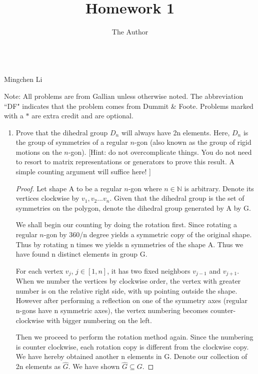 \documentclass[11pt, oneside]{article}
\title{Homework 1}
\author{The Author}
\newcommand{\N}{\mathbb N}
\begin{document}
\begin{center}\\Mingchen Li\\ \end{center}

\hrulefill %

Note: All problems are from Gallian unless otherwise noted. The abbreviation ``DF" indicates that the problem comes from Dummit \& Foote. Problems marked with a $*$ are extra credit and are optional.

\begin{enumerate}

\item Prove that the dihedral group $D_{n}$ will always have 2n elements.  Here, $D_n$ is the group of symmetries of a regular $n$-gon (also known as the group of rigid motions on the $n$-gon).  [Hint: do not overcomplicate things. You do not need to resort to matrix representations or generators to prove this result. A simple counting argument will suffice here! ]

\begin{proof}
Let shape A to be a regular $n$-gon where $n \in \N$ is arbitrary. Denote its vertices clockwise by $v_1, v_2 ...v_n$. Given that the dihedral group is the set of symmetries on the polygon, denote the dihedral group generated by A by G.

\newline We shall begin our counting by doing the rotation first. Since rotating a regular $n$-gon by 360/n degree yields a symmetric copy of the original shape. Thus by rotating n times we yields n symmetries of the shape A. Thus we have found n distinct elements in group G.

 \linebreak For each vertex $v_j$, $j\in [1,n]$, it has two fixed neighbors $v_{j-1}$ and $v_{j+1}$. When we number the vertices by clockwise order, the vertex with greater number is on the relative right side, with up pointing outside the shape. However after performing a reflection on one of the symmetry axes (regular n-gons have n symmetric axes), the vertex numbering becomes counter-clockwise with bigger numbering on the left. 
 
 \linebreak Then we proceed to perform the rotation method again. Since the numbering is counter clockwise, each rotation copy is different from the clockwise copy. We have hereby obtained another n elements in G. Denote our collection of 2n elements as $\hat{G}$. We have shown $\hat{G}\subseteq G$.
 

\end{proof}
\end{enumerate}
\end{document}
